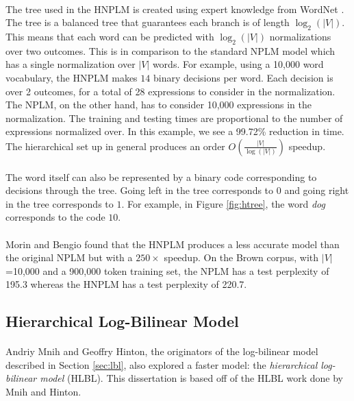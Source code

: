 \paragraph{}
The tree used in the HNPLM is created using expert knowledge from WordNet \cite{MorinBengio2005}. The tree is a balanced tree that guarantees each branch is of length $\log_2(|V|)$. This means that each word can be predicted with $\log_2(|V|)$ normalizations over two outcomes. This is in comparison to the standard NPLM model which has a single normalization over $|V|$ words. For example, using a 10,000 word vocabulary, the HNPLM makes $14$ binary decisions per word. Each decision is over 2 outcomes, for a total of 28 expressions to consider in the normalization. The NPLM, on the other hand, has to consider 10,000 expressions in the normalization. The training and testing times are proportional to the number of expressions normalized over. In this example, we see a 99.72\% reduction in time. The hierarchical set up in general produces an order $O(\frac{|V|}{\log(|V|)})$ speedup.

\paragraph{}
The word itself can also be represented by a binary code corresponding to decisions through the tree. Going left in the tree corresponds to $0$ and going right in the tree corresponds to $1$. For example, in Figure \ref{fig:htree}, the word \emph{dog} corresponds to the code $10$.

\paragraph{}
Morin and Bengio found that the HNPLM produces a less accurate model than the original NPLM but with a $250\times$ speedup. On the Brown corpus, with $|V|$=10,000 and a 900,000 token training set, the NPLM has a test perplexity of 195.3 whereas the HNPLM has a test perplexity of 220.7.

\subsection{Hierarchical Log-Bilinear Model} \label{sec:HLBL}
\paragraph{}
Andriy Mnih and Geoffry Hinton, the originators of the log-bilinear model described in Section \ref{sec:lbl},  also explored a faster model: the \emph{hierarchical log-bilinear model} (HLBL). This dissertation is based off of the HLBL work done by Mnih and Hinton. 

